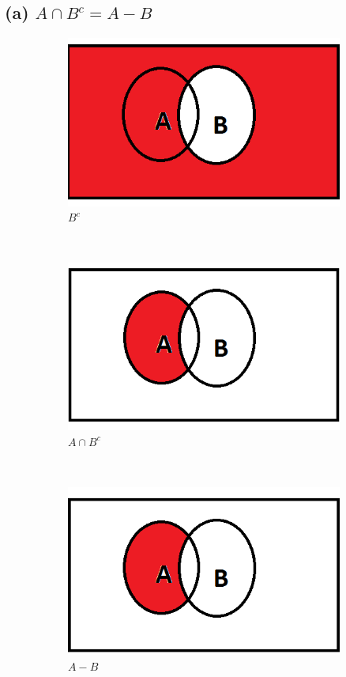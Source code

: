 \documentclass[a4paper,11pt]{report}
\begin{document}
\subsection*{(a) $A \cap B^c = A-B$}
\begin{figure}[h]
    \centering
    \begin{subfigure}[b]{0.25\textwidth}
        \includegraphics[width=\textwidth]{BC}
        \caption{$B^c$}
    \end{subfigure}
 ~
    \begin{subfigure}[b]{0.25\textwidth}
        \includegraphics[width=\textwidth]{AnBc}
        \caption{$A \cap B^c$}
    \end{subfigure}
 ~
    \begin{subfigure}[b]{0.25\textwidth}
        \includegraphics[width=\textwidth]{A-B}
        \caption{$A-B$}
        \label{fig:mouse}
    \end{subfigure}
    \caption{}

\end{figure}
\end{document}
